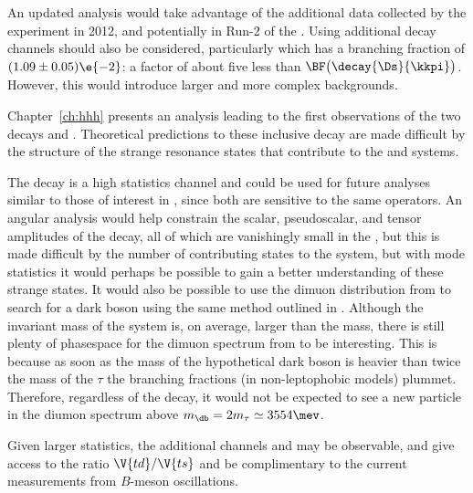 An updated analysis would take advantage of the additional data collected by the \lhcb experiment
in 2012, and potentially in Run-2 of the \lhc.
Using additional \Ds decay channels should also be considered, particularly \decay{\Ds}{\pip\pipi}
which has a branching fraction of $(1.09\pm0.05)\e{-2}$: a factor of about five less than
$\BF\big(\decay{\Ds}{\kkpi}\big)$.
However, this would introduce larger and more complex backgrounds.



Chapter~\ref{ch:hhh} presents an analysis leading to the first observations of the two decays
\btokpipimumu and \btophikmumu.
Theoretical predictions to these inclusive decay are made difficult by the structure of the strange
resonance states that contribute to the \kpipi and \phik systems.

The decay \btokpipimumu is a high statistics channel and could be used for future analyses similar to
those of interest in \btokstrmumu, since both are sensitive to the same operators.
An angular analysis would help constrain the scalar, pseudoscalar, and tensor amplitudes of the
decay, all of which are vanishingly small in the \sm, but this is made difficult by the number of
contributing states to the \kpipi system,
but with mode statistics it would perhaps be possible to gain a better understanding of these
strange states.
It would also be possible to use the dimuon distribution from \btokpipimumu to search for a dark
boson using the same method outlined in .
Although the invariant mass of the \kpipi system is, on average, larger than the \Kstarz mass,
there is still plenty of phasespace for the dimuon spectrum from \btokpipimumu to be interesting.
This is because as soon as the mass of the hypothetical dark boson is heavier than twice the mass
of the $\tau$ the branching fractions (in non-leptophobic models) plummet.
Therefore, regardless of the decay, it would not be expected to see a new particle in the diumon
spectrum above $m_\db=2m_\tau\simeq3554\mev$.

Given larger statistics, the additional channels \decay{\Bp}{\Kp\Km\pip} and \decay{\Bp}{\pip\pipi}
may be observable, and give access to the ratio $\V{td}/\V{ts}$ and be complimentary to the current
measurements from $B$-meson oscillations.

